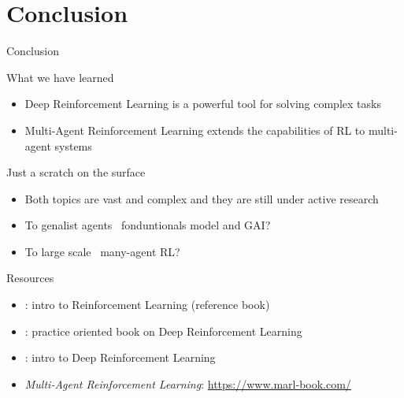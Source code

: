 \documentclass[presentation, 9pt]{beamer}\mode<presentation>{\usetheme{AMSBolognaFC}}
\begin{document}
\section{Conclusion}
\begin{frame}[shrink=5]{Conclusion}
	\begin{block}{What we have learned}
		\begin{itemize}
			\item Deep Reinforcement Learning is a powerful tool for solving complex tasks
			\item Multi-Agent Reinforcement Learning extends the capabilities of RL to multi-agent systems 
		\end{itemize}
	\end{block}
	\begin{exampleblock}{Just a scratch on the surface}
		\begin{itemize}
			\item Both topics are vast and complex and they are still under active research
			\item To genalist agents \faArrowRight \, fonduntionals model and GAI?
			\item To large scale \faArrowRight \, many-agent RL?
		\end{itemize}
	\end{exampleblock}
	\begin{block}{Resources}
		\begin{itemize}
			\item {}: intro to Reinforcement Learning (reference book)
			\item {}: practice oriented book on Deep Reinforcement Learning
			\item {}: intro to Deep Reinforcement Learning
			\item \emph{Multi-Agent Reinforcement Learning}: \url{https://www.marl-book.com/}
		\end{itemize}
	\end{block}
\end{frame}
	
\section*{}

\frame{\titlepage}
\end{document}
